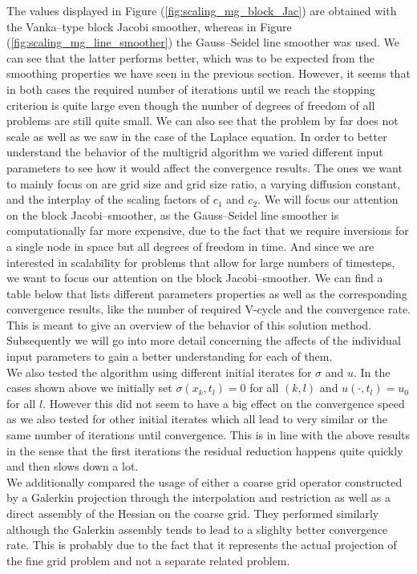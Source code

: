 \documentclass[../draft_1.tex]{subfiles}
\begin{document}
The values displayed in Figure (\ref{fig:scaling_mg_block_Jac}) are obtained with the Vanka--type block Jacobi smoother, whereas in Figure (\ref{fig:scaling_mg_line_smoother}) the Gauss--Seidel line smoother was used. We can see that the latter performs better, which was to be expected from the smoothing properties we have seen in the previous section. However, it seems that in both cases the required number of iterations until we reach the stopping criterion is quite large even though the number of degrees of freedom of all problems are still quite small. We can also see that the problem by far does not scale as well as we saw in the case of the Laplace equation. In order to better understand the behavior of the multigrid algorithm we varied different input parameters to see how it would affect the convergence results. The ones we want to mainly focus on are grid size and grid size ratio, a varying diffusion constant, and the interplay of the scaling factors of $c_1$ and $c_2$. We will focus our attention on the block Jacobi--smoother, as the Gauss--Seidel line smoother is computationally far more expensive, due to the fact that we require inversions for a single node in space but all degrees of freedom in time. And since we are interested in scalability for problems that allow for large numbers of timesteps, we want to focus our attention on the block Jacobi--smoother. We can find a table below that lists different parameters properties as well as the corresponding convergence results, like the number of required V-cycle and the convergence rate. This is meant to give an overview of the behavior of this solution method. Subsequently we will go into more detail concerning the affects of the individual input parameters to gain a better understanding for each of them. 
\smallskip
\\
We also tested the algorithm using different initial iterates for $\sigma$ and $u$. In the cases shown above we initially set $\sigma(x_k, t_l) = 0$ for all $(k, l)$ and $u(\cdot, t_l) = u_0$ for all $l$. However this did not seem to have a big effect on the convergence speed as we also tested for other initial iterates which all lead to very similar or the same number of iterations until convergence. This is in line with the above results in the sense that the first iterations the residual reduction happens quite quickly and then slows down a lot. 
\smallskip
\\
We additionally compared the usage of either a coarse grid operator constructed by a Galerkin projection through the interpolation and restriction as well as a direct assembly of the Hessian on the coarse grid. They performed similarly although the Galerkin assembly tends to lead to a slighlty better convergence rate. This is probably due to the fact that it represents the actual projection of the fine grid problem and not a separate related problem.
\end{document}
